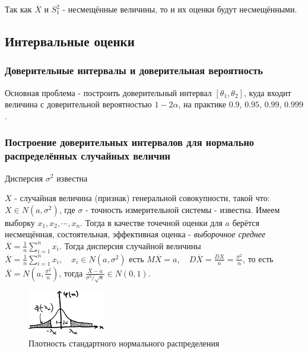 \documentclass[12pt, a4paper]{article}
\begin{document}
Так как $\overline{X}$ и $S^2_1$ - несмещённые величины, то и их оценки будут несмещёнными.

\subsection{Интервальные оценки}
\subsubsection{Доверительные интервалы и доверительная вероятность}
Основная проблема - построить доверительный интервал $[\theta_1, \theta_2]$, куда входит величина с доверительной вероятностью $1-2\alpha$, на практике $0.9$, $0.95$, $0.99$, $0.999$.

\subsubsection{Построение доверительных интервалов для нормально распределённых случайных величин}

\begin{center}
\begin{Large}
Дисперсия $\sigma^2$ известна
\end{Large}
\end{center}

$X$ - случайная величина (признак) генеральной совокупности, такой что: $X \in N(a, \sigma^2)$, где $\sigma$ - точность измерительной системы - известна. Имеем выборку $x_1, x_2, \cdots, x_n$. Тогда в качестве точечной оценки для $a$ берётся несмещённая, состоятельная, эффективная оценка - \textit{выборочное среднее} $\overline{X} = \frac{1}{n} \sum_{i=1}^n x_i$. Тогда дисперсия случайной величины $\overline{X} = \frac{1}{n} \sum_{i=1}^n x_i, \quad x_i \in N(a, \sigma^2)$ есть $M\overline{X} = a, \quad D\overline{X} = \frac{DX}{n} = \frac{\sigma^2}{n}$, то есть $\overline{X} = N(a, \frac{\sigma^2}{n})$, тогда $\frac{\overline{X} - a}{\sigma^2 / \sqrt{n}} \in N(0, 1)$.

\begin{figure}
  \centering
  \includegraphics[width=0.3\textwidth]{02}
  \vspace{-4mm}
  \caption{Плотность стандартного нормального распределения}
\end{figure}
\end{document}
